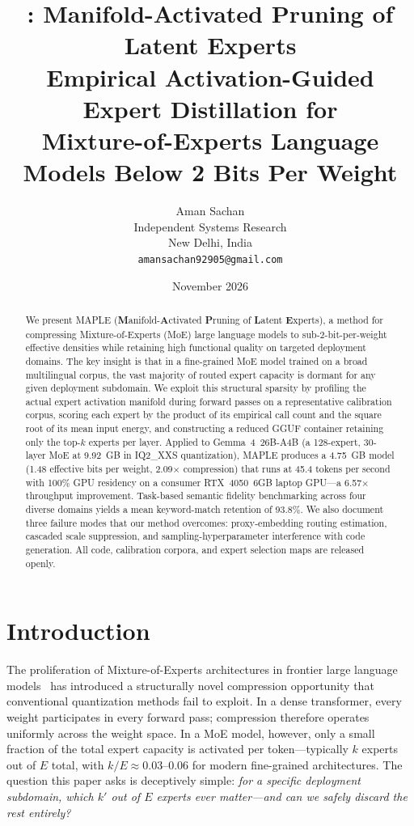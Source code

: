 \documentclass[final]{article}
\title{%
  \MAPLE: Manifold-Activated Pruning of Latent Experts\\[0.5em]
  \large Empirical Activation-Guided Expert Distillation for\\
  Mixture-of-Experts Language Models Below 2 Bits Per Weight
}
\author{
  Aman Sachan\\
  Independent Systems Research\\
  New Delhi, India\\
  \texttt{amansachan92905@gmail.com}
}
\date{November 2026}
\newcommand{\MAPLE}{\textsc{MAPLE}}
\begin{document}
\maketitle

\begin{abstract}
We present \MAPLE{} (\textbf{M}anifold-\textbf{A}ctivated \textbf{P}runing of \textbf{L}atent \textbf{E}xperts), a
method for compressing Mixture-of-Experts (MoE) large language models to sub-2-bit-per-weight
effective densities while retaining high functional quality on targeted deployment domains. The key
insight is that in a fine-grained MoE model trained on a broad multilingual corpus, the vast majority
of routed expert capacity is dormant for any given deployment subdomain. We exploit this structural
sparsity by profiling the actual expert activation manifold during forward passes on a representative
calibration corpus, scoring each expert by the product of its empirical call count and the square
root of its mean input energy, and constructing a reduced GGUF container retaining only the
top-$k$ experts per layer. Applied to Gemma~4~26B-A4B (a 128-expert, 30-layer MoE at 9.92~GB in
IQ2\_XXS quantization), \MAPLE{} produces a 4.75~GB model (1.48 effective bits per weight,
2.09$\times$ compression) that runs at 45.4 tokens per second with 100\% GPU residency on a
consumer RTX~4050~6GB laptop GPU---a 6.57$\times$ throughput improvement. Task-based semantic
fidelity benchmarking across four diverse domains yields a mean keyword-match retention of 93.8\%.
We also document three failure modes that our method overcomes: proxy-embedding routing estimation,
cascaded scale suppression, and sampling-hyperparameter interference with code generation.
All code, calibration corpora, and expert selection maps are released openly.
\end{abstract}

\section{Introduction}
\label{sec:intro}

The proliferation of Mixture-of-Experts architectures in frontier large language models~\cite{jiang2024mixtral,dai2024deepseekmoe,team2025gemma} has introduced a structurally novel compression opportunity that conventional quantization methods fail to exploit. In a dense transformer, every weight participates in every forward pass; compression therefore operates uniformly across the weight space. In a MoE model, however, only a small fraction of the total expert capacity is activated per token---typically $k$ experts out of $E$ total, with $k/E \approx 0.03$--$0.06$ for modern fine-grained architectures. The question this paper asks is deceptively simple: \emph{for a specific deployment subdomain, which $k'$ out of $E$ experts ever matter---and can we safely discard the rest entirely?}
\end{document}
